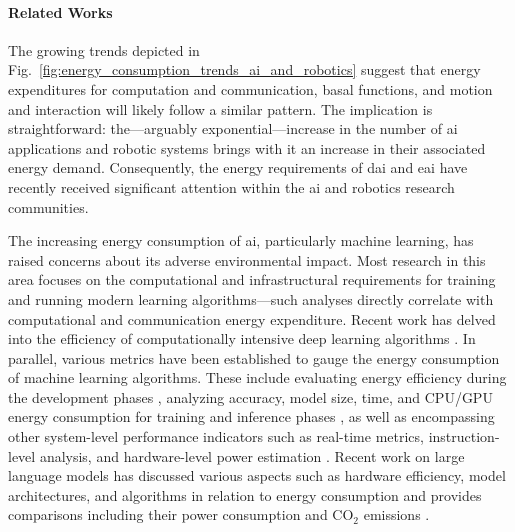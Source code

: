 \documentclass[12pt]{article}
\begin{document}
\paragraph*{Related Works} The growing trends depicted in Fig.~\ref{fig:energy_consumption_trends_ai_and_robotics} suggest that energy expenditures for computation and communication, basal functions, and motion and interaction will likely follow a similar pattern. The implication is straightforward: the---arguably exponential---increase in the number of \ac{ai} applications and robotic systems brings with it an increase in their associated energy demand. Consequently, the energy requirements of \ac{dai} and \ac{eai} have recently received significant attention within the \ac{ai} and robotics research communities.

The increasing energy consumption of \ac{ai}, particularly machine learning, has raised concerns about its adverse environmental impact. Most research in this area focuses on the computational and infrastructural requirements for training and running modern learning algorithms---such analyses directly correlate with computational and communication energy expenditure. Recent work has delved into the efficiency of computationally intensive deep learning algorithms \cite{Schwartz2019GreenAI,Vinuesa2020roleartificialintelligence,Strubell2019EnergyPolicyConsiderations,Luccioni2023EstimatingCarbonFootprint}. In parallel, various metrics have been established to gauge the energy consumption of machine learning algorithms. These include evaluating energy efficiency during the development phases \cite{Zhou2020HULKEnergyEfficiency}, analyzing accuracy, model size, time, and CPU/GPU energy consumption for training and inference phases \cite{Dalgren2019GreenMLmethodology}, as well as encompassing other system-level performance indicators such as real-time metrics, instruction-level analysis, and hardware-level power estimation \cite{GarciaMartin2019Estimationenergyconsumption}. Recent work on large language models has discussed various aspects such as hardware efficiency, model architectures, and algorithms in relation to energy consumption \cite{Vries2023growingenergyfootprint} and provides comparisons including their power consumption and CO$_2$ emissions \cite{SIHCAI2023ArtificialIntelligenceIndex}.
\end{document}
